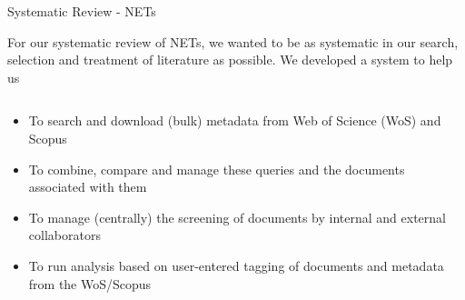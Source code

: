 \documentclass[9pt]{beamer}
\begin{document}



\begin{frame}{Systematic Review - NETs}

For our systematic review of NETs, we wanted to be as systematic in our search, selection and treatment of literature as possible. We developed a system to help us

\begin{columns}
	\begin{column}{1\linewidth}
		\begin{itemize}
			\item To search and download (bulk) metadata from Web of Science (WoS) and Scopus
			\item To combine, compare and manage these queries and the documents associated with them
			\item To manage (centrally) the screening of documents by internal and external collaborators
			\item To run analysis based on user-entered tagging of documents and metadata from the WoS/Scopus
		\end{itemize}
	\end{column}

\end{columns}

\end{frame}


\end{document}
